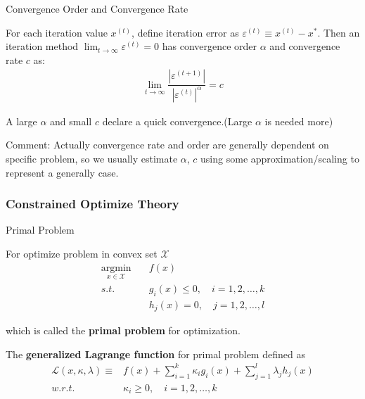     
\begin{point}
    Convergence Order and Convergence Rate
\end{point}

    For each iteration value $ x^{(t)} $, define iteration error as $ \varepsilon ^{(t)}\equiv x^{(t)}-x^* $. Then an iteration method $ \lim_{t\to \infty}\varepsilon ^{(t)}=0 $ has convergence order $ \alpha  $ and convergence rate $ c $ as:
    \begin{align}
        \lim_{t\to\infty}\dfrac{|\varepsilon ^{(t+1)}|}{|\varepsilon ^{(t)}|^\alpha }=c 
    \end{align}
    
     A large $ \alpha  $ and small $ c $ declare a quick convergence.(Large $ \alpha  $ is needed more)

    Comment: Actually convergence rate and order are generally dependent on specific problem, so we usually estimate $ \alpha  $, $ c $ using some approximation/scaling to represent a generally case.

\subsubsection{Constrained Optimize Theory}
\begin{point}
    Primal Problem
\end{point}


    For optimize problem in convex set $ \mathcal{X} $
\begin{align}
        \mathop{\arg\min}\limits_{x\in\mathcal{X}}\quad &f(x)\tag{P}\\
        s.t.\quad   &g_i(x)\leq 0,\quad i=1,2,\ldots,k\\
        & h_j(x)=0,\quad j=1,2,\ldots,l
\end{align}

    which is called the \textbf{primal problem} for optimization.
    
    The \textbf{generalized Lagrange function} for primal problem defined as 
\begin{equation}\label{EqaGeneralizedLagrangeFunction}
 \begin{aligned}
    \mathcal{L}(x,\kappa ,\lambda )\equiv& f(x)+\sum_{i=1}^k\kappa _ig_i(x)+\sum_{j=1}^l\lambda _jh_j(x) \\
    w.r.t. \quad&\kappa _i\geq 0,\quad i=1,2,\ldots,k
\end{aligned}   
\end{equation}

